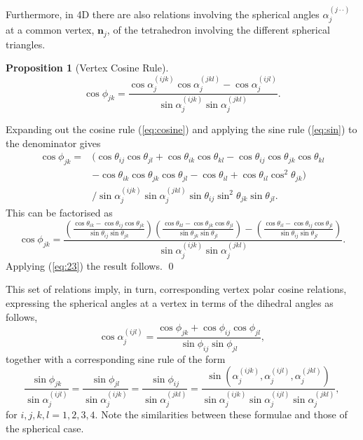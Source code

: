 \documentclass[fleqn,11pt,twoside]{article}
\makeatletter
\renewenvironment{proof}[1][\proofname]{\par
  \normalfont
  \topsep6\p@\@plus6\p@ \trivlist
  \item[\hskip\labelsep\textbf{%
    #1\@addpunct{.}}]\ignorespaces
}{%
  \qed\endtrivlist
}
\theoremstyle{definition}
\newtheorem{prop}{Proposition}
\makeatother
\begin{document}
Furthermore, in 4D there are also relations involving the spherical angles $\alpha_j^{(j\cdot \cdot)}$ at a common vertex, $\mathbf{n}_j$, of the tetrahedron involving the different spherical triangles.
\begin{prop}[Vertex Cosine Rule]
\begin{equation}
\cos\phi_{jk}=\frac{\cos\alpha_j^{(ijk)}\cos\alpha_j^{(jkl)}-\cos\alpha_j^{(ijl)}}{\sin\alpha_j^{(ijk)}\sin\alpha_j^{(jkl)}}.
\end{equation}
\end{prop}
\begin{proof}
Expanding out the cosine rule (\ref{eq:cosine}) and applying the sine rule (\ref{eq:sin}) to the denominator gives
\begin{equation}
\begin{split}
\cos\phi_{jk}=&(\cos\theta_{ij}\cos\theta_{jl}+\cos\theta_{ik}\cos\theta_{kl}-\cos\theta_{ij}\cos\theta_{jk}\cos\theta_{kl}\\
&-\cos\theta_{ik}\cos\theta_{jk}\cos\theta_{jl}-\cos\theta_{il}+\cos\theta_{il}\cos^2\theta_{jk})\\
&/{\sin\alpha_j^{(ijk)}\sin\alpha_j^{(jkl)}\sin\theta_{ij}\sin^2\theta_{jk}\sin\theta_{jl}}.
\end{split}
\end{equation}
This can be factorised as
\begin{equation}
\cos\phi_{jk}=\frac{\left(\frac{\cos\theta_{ik}-\cos\theta_{ij}\cos\theta_{jk}
}{\sin\theta_{ij}\sin\theta_{jk}}\right)\left(\frac{\cos\theta_{kl}-\cos\theta_{jk}\cos\theta_{jl}
}{\sin\theta_{jk}\sin\theta_{jl}}\right)-\left(\frac{\cos\theta_{il}-\cos\theta_{ij}\cos\theta_{jl}
}{\sin\theta_{ij}\sin\theta_{jl}}\right)}
{\sin\alpha_j^{(ijk)}\sin\alpha_j^{(jkl)}}.
\end{equation}
Applying (\ref{eq:23}) the result follows.
\end{proof}

This set of relations imply, in turn, corresponding vertex polar cosine relations, expressing the spherical angles at a vertex in terms of the dihedral angles as follows,
\begin{equation}
\cos\alpha_j^{(ijl)}=\frac{\cos\phi_{jk}+\cos\phi_{ij}\cos\phi_{jl}}{\sin\phi_{ij}\sin\phi_{jl}},
\end{equation}
together with a corresponding sine rule of the form
\begin{equation}
\frac{\sin\phi_{jk}}{\sin\alpha_{j}^{(ijl)}}=\frac{\sin\phi_{jl}}{\sin\alpha_{j}^{(ijk)}}=\frac{\sin\phi_{ij}}{\sin\alpha_{j}^{(jkl)}}=\frac{\sin(\alpha_{j}^{(ijk)},\alpha_{j}^{(ijl)},\alpha_{j}^{(jkl)})}{\sin\alpha_{j}^{(ijk)}\sin\alpha_{j}^{(ijl)}\sin\alpha_{j}^{(jkl)}},
\end{equation}
for $i,j,k,l=1,2,3,4$. Note the similarities between these formulae and those of the spherical case.
\end{document}
